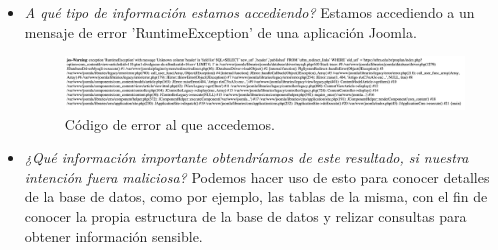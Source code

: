 \documentclass[12pt]{book}
\begin{document}
\begin{itemize}
    \item \textit{A qué tipo de información estamos accediendo?}
    \newline
    Estamos accediendo a un mensaje de error 'RuntimeException' de una aplicación Joomla.
    \begin{figure}[h]
        \centering
        \includegraphics[width=\linewidth]{Practica 3y4/images/Screenshot 2024-10-24 at 10.06.47.png}
        \caption{Código de error al que accedemos.}
        \label{fig:enter-label}
    \end{figure}
    \item \textit{¿Qué información importante obtendríamos de este resultado, si nuestra intención fuera maliciosa?}
    \newline
    Podemos hacer uso de esto para conocer detalles de la base de datos, como por ejemplo, las tablas de la misma, con el fin de conocer la propia estructura de la base de datos y relizar consultas para obtener información sensible.
\end{itemize}
\end{document}
